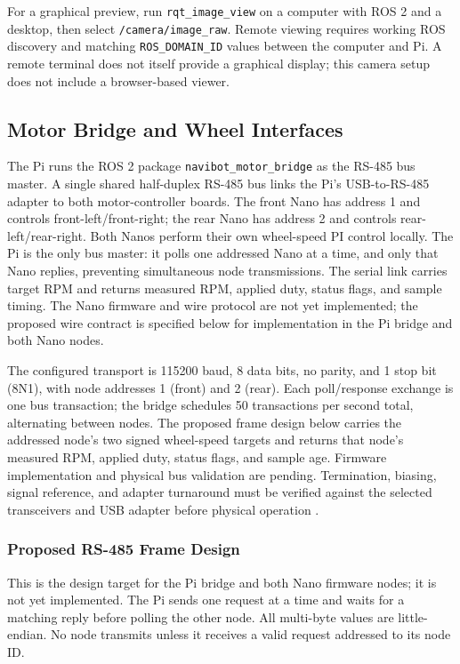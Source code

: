 For a graphical preview, run \texttt{rqt\_image\_view} on a computer with ROS 2 and a desktop, then select \texttt{/camera/image\_raw}. Remote viewing requires working ROS discovery and matching \texttt{ROS\_DOMAIN\_ID} values between the computer and Pi. A remote terminal does not itself provide a graphical display; this camera setup does not include a browser-based viewer.

\subsection{Motor Bridge and Wheel Interfaces}
The Pi runs the ROS 2 package \texttt{navibot\_motor\_bridge} as the RS-485 bus master. A single shared half-duplex RS-485 bus links the Pi's USB-to-RS-485 adapter to both motor-controller boards. The front Nano has address 1 and controls front-left/front-right; the rear Nano has address 2 and controls rear-left/rear-right. Both Nanos perform their own wheel-speed PI control locally. The Pi is the only bus master: it polls one addressed Nano at a time, and only that Nano replies, preventing simultaneous node transmissions. The serial link carries target RPM and returns measured RPM, applied duty, status flags, and sample timing. The Nano firmware and wire protocol are not yet implemented; the proposed wire contract is specified below for implementation in the Pi bridge and both Nano nodes.

The configured transport is 115200 baud, 8 data bits, no parity, and 1 stop bit (8N1), with node addresses 1 (front) and 2 (rear). Each poll/response exchange is one bus transaction; the bridge schedules 50 transactions per second total, alternating between nodes. The proposed frame design below carries the addressed node's two signed wheel-speed targets and returns that node's measured RPM, applied duty, status flags, and sample age. Firmware implementation and physical bus validation are pending. Termination, biasing, signal reference, and adapter turnaround must be verified against the selected transceivers and USB adapter before physical operation \cite{ti_rs485}.

\subsubsection{Proposed RS-485 Frame Design}
This is the design target for the Pi bridge and both Nano firmware nodes; it is not yet implemented. The Pi sends one request at a time and waits for a matching reply before polling the other node. All multi-byte values are little-endian. No node transmits unless it receives a valid request addressed to its node ID.


